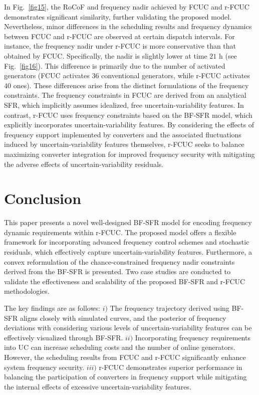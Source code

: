 \documentclass[lettersize,journal]{IEEEtran}
\begin{document}
In Fig.~\ref{fig15}, the RoCoF and frequency nadir achieved by FCUC and r-FCUC demonstrates significant similarity, further validating the proposed model. Nevertheless, minor differences in the scheduling results and frequency dynamics between FCUC and r-FCUC are observed at certain dispatch intervals. For instance, the frequency nadir under r-FCUC is more conservative than that obtained by FCUC. Specifically, the nadir is slightly lower at time $21$ h (see Fig.~\ref{fig16}). This difference is primarily due to the number of activated generators (FCUC activates $36$ conventional generators, while r-FCUC activates $40$ ones). These differences arise from the distinct formulations of the frequency constraints. The frequency constraints in FCUC are derived from an analytical SFR, which implicitly assumes idealized, free uncertain-variability features. In contrast, r-FCUC uses frequency constraints based on the BF-SFR model, which explicitly incorporates uncertain-variability features. By considering the effects of frequency support implemented by converters and the associated fluctuations induced by uncertain-variability features themselves, r-FCUC seeks to balance maximizing converter integration for improved frequency security with mitigating the adverse effects of uncertain-variability residuals.


\vspace{-0.05in} 

\section{Conclusion} 

\vspace{-0.025in}

This paper presents a novel well-designed BF-SFR model for encoding frequency dynamic requirements within r-FCUC. The proposed model offers a flexible framework for incorporating advanced frequency control schemes and stochastic residuals, which effectively capture uncertain-variability features. Furthermore, a convex reformulation of the chance-constrained frequency nadir constraints derived from the BF-SFR is presented. Two case studies are conducted to validate the effectiveness and scalability of the proposed BF-SFR and r-FCUC methodologies.

The key findings are as follows:
$i)$ The frequency trajectory derived using BF-SFR aligns closely with simulated curves, and the posterior of frequency deviations with considering various levels of uncertain-variability features can be effectively visualized through BF-SFR.
$ii)$ Incorporating frequency requirements into UC can increase scheduling costs and the number of online generators. However, the scheduling results from FCUC and r-FCUC significantly enhance system frequency security.
$iii)$ r-FCUC demonstrates superior performance in balancing the participation of converters in frequency support while mitigating the internal effects of excessive uncertain-variability features.



\vspace{-0.1in}

\end{document}
